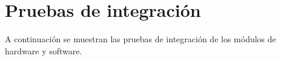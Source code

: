 \section{Pruebas de integración}
A continuación se muestran las pruebas de integración de los módulos de hardware y software.



